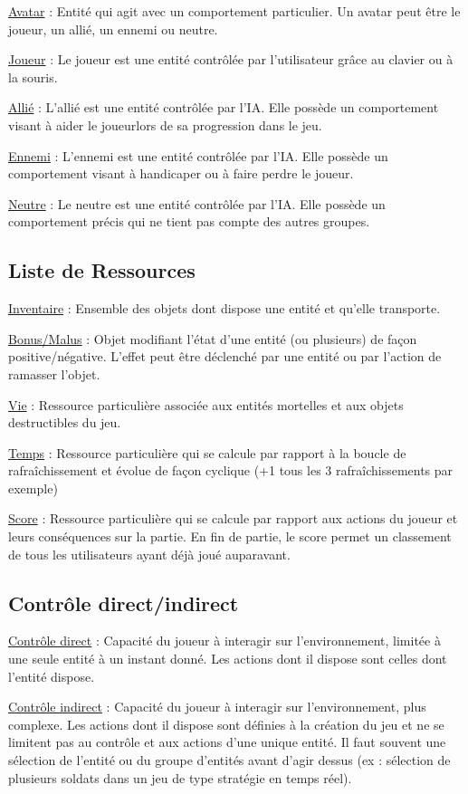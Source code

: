 \underline{Avatar} :
Entité qui agit avec un comportement particulier. Un avatar peut être le joueur, un allié, un ennemi ou neutre.

\underline{Joueur} :
Le joueur est une entité contrôlée par l'utilisateur grâce au clavier ou à la souris.

\underline{Allié} :
L'allié est une entité contrôlée par l'IA. Elle possède un comportement visant à aider le joueurlors de sa progression dans le jeu.

\underline{Ennemi} :
L'ennemi est une entité contrôlée par l'IA. Elle possède un comportement visant à handicaper ou à faire perdre le joueur.

\underline{Neutre} :
Le neutre est une entité contrôlée par l'IA. Elle possède un comportement précis qui ne tient pas compte des autres groupes.


\subsection*{Liste de Ressources}

\underline{Inventaire} : 
Ensemble des objets dont dispose une entité et qu'elle transporte.

\underline{Bonus/Malus} :
Objet modifiant l'état d'une entité (ou plusieurs) de façon positive/négative. L'effet peut être déclenché par une entité ou par l'action de ramasser l'objet.

\underline{Vie} : 
Ressource particulière associée aux entités mortelles et aux objets destructibles du jeu.

\underline{Temps} :
Ressource particulière qui se calcule par rapport à la boucle de rafraîchissement et évolue de façon cyclique (+1 tous les 3 rafraîchissements par exemple)

\underline{Score} :
Ressource particulière qui se calcule par rapport aux actions du joueur et leurs conséquences sur la partie.
En fin de partie, le score permet un classement de tous les utilisateurs ayant déjà joué auparavant.

\subsection*{Contrôle direct/indirect}

\underline{Contrôle direct} :
Capacité du joueur à interagir sur l’environnement, limitée à une seule entité à un instant donné. 
Les actions dont il dispose sont celles dont l'entité dispose.

\underline{Contrôle indirect} :
Capacité du joueur à interagir sur l’environnement, plus complexe. 
Les actions dont il dispose sont définies à la création du jeu et ne se limitent pas au contrôle et aux actions d'une unique entité.
Il faut souvent une sélection de l'entité ou du groupe d'entités avant d'agir dessus (ex : sélection de plusieurs soldats dans un jeu de type stratégie en temps réel).

